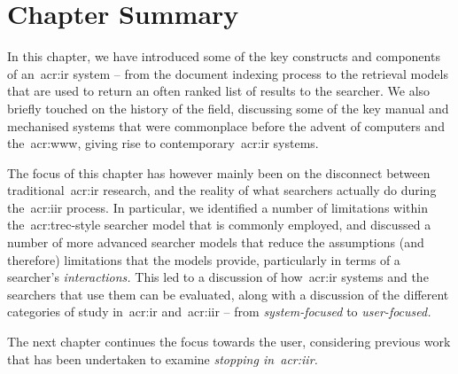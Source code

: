 \vspace*{-2mm}
\section{Chapter Summary}
In this chapter, we have introduced some of the key constructs and components of an~\gls{acr:ir} system -- from the document indexing process to the retrieval models that are used to return an often ranked list of results to the searcher. We also briefly touched on the history of the field, discussing some of the key manual and mechanised systems that were commonplace before the advent of computers and the~\gls{acr:www}, giving rise to contemporary~\gls{acr:ir} systems.

The focus of this chapter has however mainly been on the disconnect between traditional~\gls{acr:ir} research, and the reality of what searchers actually do during the~\gls{acr:iir} process. In particular, we identified a number of limitations within the~\gls{acr:trec}-style searcher model that is commonly employed, and discussed a number of more advanced searcher models that reduce the assumptions (and therefore) limitations that the models provide, particularly in terms of a searcher's \emph{interactions.} This led to a discussion of how~\gls{acr:ir} systems and the searchers that use them can be evaluated, along with a discussion of the different categories of study in~\gls{acr:ir} and~\gls{acr:iir} -- from \emph{system-focused} to \emph{user-focused.}

The next chapter continues the focus towards the user, considering previous work that has been undertaken to examine \emph{stopping in~\gls{acr:iir}.}

\newpage
\thispagestyle{empty}
\mbox{}